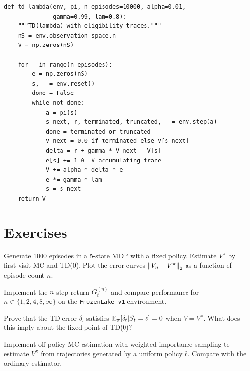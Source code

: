 \begin{codeblock}[title=\textbf{TD($\lambda$) with Eligibility Traces}]
\begin{verbatim}
def td_lambda(env, pi, n_episodes=10000, alpha=0.01,
              gamma=0.99, lam=0.8):
    """TD(lambda) with eligibility traces."""
    nS = env.observation_space.n
    V = np.zeros(nS)

    for _ in range(n_episodes):
        e = np.zeros(nS)
        s, _ = env.reset()
        done = False
        while not done:
            a = pi(s)
            s_next, r, terminated, truncated, _ = env.step(a)
            done = terminated or truncated
            V_next = 0.0 if terminated else V[s_next]
            delta = r + gamma * V_next - V[s]
            e[s] += 1.0  # accumulating trace
            V += alpha * delta * e
            e *= gamma * lam
            s = s_next
    return V
\end{verbatim}
\end{codeblock}

\section{Exercises}

\begin{exercise}[MC vs TD Variance]
Generate 1000 episodes in a 5-state MDP with a fixed policy. Estimate $V^\pi$
by first-visit MC and TD(0). Plot the error curves $\left\| V_n - V^\pi \right\|_2$ as
a function of episode count $n$.
\end{exercise}

\begin{exercise}
Implement the $n$-step return $G_t^{(n)}$ and compare performance for
$n \in \{1, 2, 4, 8, \infty\}$ on the \texttt{FrozenLake-v1} environment.
\end{exercise}

\begin{exercise}
Prove that the TD error $\delta_t$ satisfies $\mathbb{E}_\pi[\delta_t | S_t = s] = 0$
when $V = V^\pi$. What does this imply about the fixed point of TD(0)?
\end{exercise}

\begin{exercise}
Implement off-policy MC estimation with weighted importance sampling to
estimate $V^\pi$ from trajectories generated by a uniform policy $b$.
Compare with the ordinary estimator.
\end{exercise}
